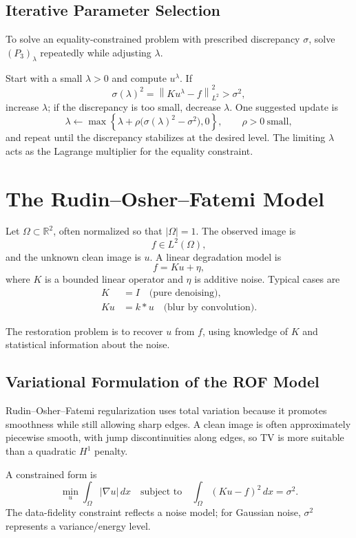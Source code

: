 \documentclass[11pt]{article}
\newcommand{\Om}{\Omega}
\newcommand{\R}{\mathbb{R}}
\newcommand{\norm}[2][]{\left\lVert #2\right\rVert_{#1}}
\theoremstyle{definition}
\theoremstyle{plain}
\begin{document}
\subsection{Iterative Parameter Selection}
To solve an equality-constrained problem with prescribed discrepancy $\sigma$, solve $(P_3)_\lambda$ repeatedly while adjusting $\lambda$.

Start with a small $\lambda>0$ and compute $u^\lambda$. If
\[
\sigma(\lambda)^2=\norm[L^2]{Ku^\lambda-f}^2>\sigma^2,
\]
increase $\lambda$; if the discrepancy is too small, decrease $\lambda$. One suggested update is
\[
\lambda\leftarrow
\max\left\{\lambda+\rho\bigl(\sigma(\lambda)^2-\sigma^2\bigr),0\right\},
\qquad \rho>0\ \text{small},
\]
and repeat until the discrepancy stabilizes at the desired level. The limiting $\lambda$ acts as the Lagrange multiplier for the equality constraint.

\section{The Rudin--Osher--Fatemi Model}

Let $\Om\subset\R^2$, often normalized so that $|\Om|=1$. The observed image is
\[
f\in L^2(\Om),
\]
and the unknown clean image is $u$. A linear degradation model is
\[
f=Ku+\eta,
\]
where $K$ is a bounded linear operator and $\eta$ is additive noise. Typical cases are
\begin{align*}
K &=I
\quad\text{(pure denoising)},\\
Ku &=k*u
\quad\text{(blur by convolution)}.
\end{align*}

The restoration problem is to recover $u$ from $f$, using knowledge of $K$ and statistical information about the noise.

\subsection{Variational Formulation of the ROF Model}
Rudin--Osher--Fatemi regularization uses total variation because it promotes smoothness while still allowing sharp edges. A clean image is often approximately piecewise smooth, with jump discontinuities along edges, so TV is more suitable than a quadratic $H^1$ penalty.

A constrained form is
\[
\min_u\int_{\Om}|\nabla u|\,dx
\quad\text{subject to}\quad
\int_{\Om}(Ku-f)^2\,dx=\sigma^2.
\]
The data-fidelity constraint reflects a noise model; for Gaussian noise, $\sigma^2$ represents a variance/energy level.
\end{document}
